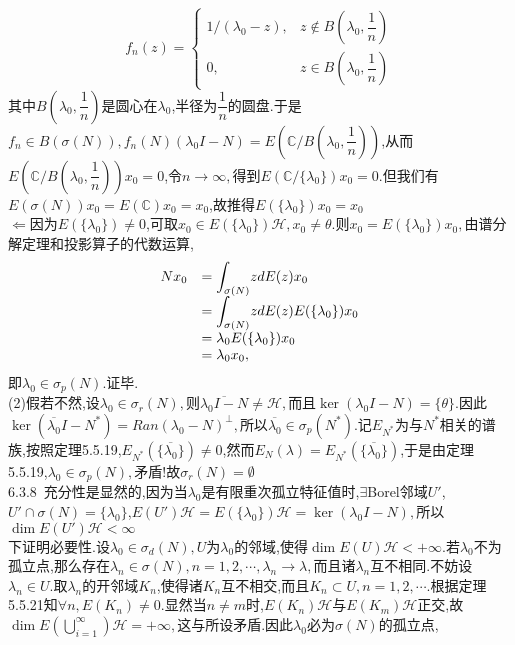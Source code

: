 \documentclass[b5paper]{ctexart}
\begin{document}
\[f_n(z)=\left\lbrace \begin{array}{ll}
1/(\lambda_0-z), & z\not\in B\left( \lambda_0,\dfrac{1}{n}\right)\\
0, & z\in B\left( \lambda_0,\dfrac{1}{n}\right)
\end{array}\right. \]
其中$B\left(\lambda_0,\dfrac{1}{n} \right) $是圆心在$\lambda_0$,半径为$\dfrac{1}{n}$的圆盘.于是$f_n\in B(\sigma(N)),f_n(N)(\lambda_0 I-N)=E\left( \mathbb{C}/B\left( \lambda_0,\dfrac{1}{n}\right) \right)$,从而$E\left( \mathbb{C}/B\left( \lambda_0,\dfrac{1}{n}\right) \right)x_0=0$,令$n\to \infty,$得到$E(\mathbb{C}/\{\lambda_0\})x_0=0.$但我们有$E(\sigma(N))x_0=E(\mathbb{C})x_0=x_0$,故推得$E(\{\lambda_0\})x_0=x_0$\\
$\Leftarrow$因为$E(\{\lambda_0\})\neq 0$,可取$x_0\in E(\{\lambda_0\})\mathscr{H},x_0\neq\theta.$则$x_0=E(\{\lambda_0\})x_0,$由谱分解定理和投影算子的代数运算,
\[\begin{array}{rl}
Nx_0 & =\mathlarger{\int}_{\sigma(N)}zdE(z)x_0\\
& =\mathlarger{\int}_{\sigma(N)}zdE(z)E(\{\lambda_0\})x_0\\
& =\lambda_0E(\{\lambda_0\})x_0\\
& =\lambda_0x_0,
\end{array}\]
即$\lambda_0\in\sigma_p(N).$证毕.\\
(2)假若不然,设$\lambda_0\in\sigma_r(N),$则$\overline{\lambda_0 I-N}\neq \mathscr{H},$而且$\ker (\lambda_0 I-N)=\{\theta\}.$因此$\ker (\overline{\lambda_0}I-N^*)=Ran (\lambda_0-N)^{\perp},$所以$\overline{\lambda_0}\in\sigma_p(N^*)$.记$E_{N^*}$为与$N^*$相关的谱族,按照定理5.5.19,$E_{N^*}(\{\overline{\lambda_0}\})\neq 0$,然而$E_{N}(\lambda)=E_{N^*}(\{\overline{\lambda_0}\})$,于是由定理5.5.19,$\lambda_0\in\sigma_p(N),$矛盾!故$\sigma_r(N)=\emptyset$\\
6.3.8~充分性是显然的,因为当$\lambda_0$是有限重次孤立特征值时,$\exists $Borel邻域$U'$,$U'\cap \sigma(N)=\{\lambda_0\}$,$E(U')\mathscr{H}=E(\{\lambda_0\})\mathscr{H}=\ker(\lambda_0 I-N),$所以$\dim E(U')\mathscr{H}<\infty$\\
下证明必要性.设$\lambda_0\in\sigma_d(N),U$为$\lambda_0$的邻域,使得$\dim E(U)\mathscr{H}<+\infty$.若$\lambda_0$不为孤立点,那么存在$\lambda_n\in\sigma(N),n=1,2,\cdots,\lambda_n\to \lambda,$而且诸$\lambda_n$互不相同.不妨设$\lambda_n\in U$.取$\lambda_n$的开邻域$K_n$,使得诸$K_n$互不相交,而且$K_n\subset U,n=1,2,\cdots.$根据定理5.5.21知$\forall n,E(K_n)\neq 0.$显然当$n\neq m$时,$E(K_n)\mathscr{H}$与$E(K_m)\mathscr{H}$正交,故$\dim E(\bigcup\limits_{i=1}^{\infty})\mathscr{H}=+\infty,$这与所设矛盾.因此$\lambda_0$必为$\sigma(N)$的孤立点,\\
\end{document}
